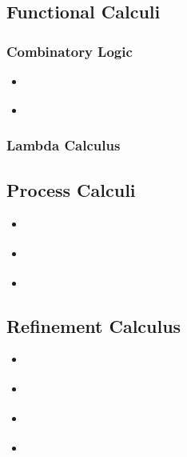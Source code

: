 \documentclass{article}
\begin{document}
 \cite{Lemmon1965-LEMBL}

\subsection{Functional Calculi}

\subsubsection{Combinatory Logic}

\begin{itemize}
\item {} \cite{bimbo2011combinatory}
\item {} \cite{Smullyan1985-SMUTMA-2}
\end{itemize}

\subsubsection{Lambda Calculus}

\subsection{Process Calculi}

\begin{itemize}
\item {} \cite{sangiorgi2003pi}
\item {} \cite{milner1999communicating}
\item {} \cite{Honda00secureinformation}
\end{itemize}

\subsection{Refinement Calculus}

\begin{itemize}
  \item {} \cite{irefinement_calc}
  \item {} \cite{back2012refinement}
  \item {} \cite{refinement_types_ml}
  \item {} \cite{morgan1990programming}
\end{itemize}
\end{document}

